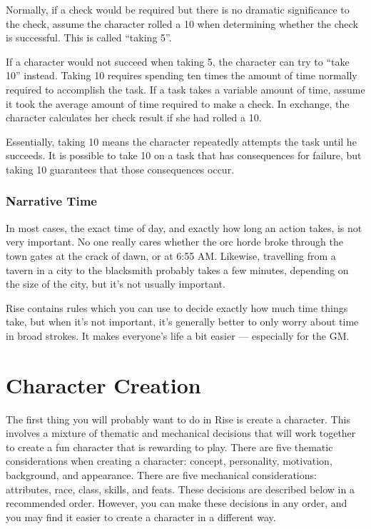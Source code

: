             \label{Taking 5}
            Normally, if a check would be required but there is no dramatic significance to the check, assume the character rolled a 10 when determining whether the check is successful.
            This is called ``taking 5''.

            \label{Taking 10}
            If a character would not succeed when taking 5, the character can try to ``take 10'' instead.
            Taking 10 requires spending ten times the amount of time normally required to accomplish the task.
            If a task takes a variable amount of time, assume it took the average amount of time required to make a check.
            In exchange, the character calculates her check result if she had rolled a 10.

            Essentially, taking 10 means the character repeatedly attempts the task until he succeeds.
            It is possible to take 10 on a task that has consequences for failure, but taking 10 guarantees that those consequences occur.

        \subsubsection{Narrative Time} In most cases, the exact time of day, and exactly how long an action takes, is not very important.
            No one really cares whether the orc horde broke through the town gates at the crack of dawn, or at 6:55 AM\@.
            Likewise, travelling from a tavern in a city to the blacksmith probably takes a few minutes, depending on the size of the city, but it's not usually important.

            Rise contains rules which you can use to decide exactly how much time things take, but when it's not important, it's generally better to only worry about time in broad strokes.
            It makes everyone's life a bit easier --- especially for the GM\@.

\section{Character Creation}

    The first thing you will probably want to do in Rise is create a character.
    This involves a mixture of thematic and mechanical decisions that will work together to create a fun character that is rewarding to play.
    There are five thematic considerations when creating a character: concept, personality, motivation, background, and appearance.
    There are five mechanical considerations: attributes, race, class, skills, and feats.
    These decisions are described below in a recommended order.
    However, you can make these decisions in any order, and you may find it easier to create a character in a different way.  

